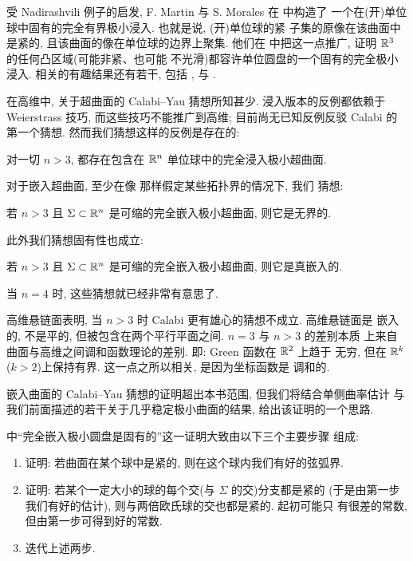 受 Nadirashvili 例子的启发, F. Martin 与 S. Morales 在 \cite{MaMo2} 中构造了
一个在(开)单位球中固有的完全有界极小浸入. 也就是说, (开)单位球的紧
子集的原像在该曲面中是紧的, 且该曲面的像在单位球的边界上聚集. 他们在
\cite{MaMo3} 中把这一点推广, 证明 $\mathbb{R}^3$ 的任何凸区域(可能非紧、也可能
不光滑)都容许单位圆盘的一个固有的完全极小浸入. 相关的有趣结果还有若干,
包括 \cite{AFM}, \cite{MaMeNa} 与 \cite{ANa}.

在高维中, 关于超曲面的 Calabi--Yau 猜想所知甚少. 浸入版本的反例都依赖于
Weierstrass 技巧, 而这些技巧不能推广到高维; 目前尚无已知反例反驳 Calabi
的第一个猜想. 然而我们猜想这样的反例是存在的:

\begin{conjecture}
\label{conj:8.20}
对一切 $n>3$, 都存在包含在 $\mathbb{R}^n$ 单位球中的完全浸入极小超曲面.
\end{conjecture}

对于嵌入超曲面, 至少在像 \cite{CM24} 那样假定某些拓扑界的情况下, 我们
猜想:

\begin{conjecture}
\label{conj:8.21}
若 $n>3$ 且 $\Sigma\subset\mathbb{R}^n$ 是可缩的完全嵌入极小超曲面, 则它是无界的.
\end{conjecture}

此外我们猜想固有性也成立:

\begin{conjecture}
\label{conj:8.22}
若 $n>3$ 且 $\Sigma\subset\mathbb{R}^n$ 是可缩的完全嵌入极小超曲面, 则它是真嵌入的.
\end{conjecture}

当 $n=4$ 时, 这些猜想就已经非常有意思了.

高维悬链面表明, 当 $n>3$ 时 Calabi 更有雄心的猜想不成立. 高维悬链面是
嵌入的, 不是平的, 但被包含在两个平行平面之间. $n=3$ 与 $n>3$ 的差别本质
上来自曲面与高维之间调和函数理论的差别. 即: Green 函数在 $\mathbb{R}^2$ 上趋于
无穷, 但在 $\mathbb{R}^k$($k>2$)上保持有界. 这一点之所以相关, 是因为坐标函数是
调和的.

嵌入曲面的 Calabi--Yau 猜想的证明超出本书范围, 但我们将结合单侧曲率估计
与我们前面描述的若干关于几乎稳定极小曲面的结果, 给出该证明的一个思路.

\cite{CM24} 中``完全嵌入极小圆盘是固有的''这一证明大致由以下三个主要步骤
组成:

\begin{enumerate}
\item 证明: 若曲面在某个球中是紧的, 则在这个球内我们有好的弦弧界.
\item 证明: 若某个一定大小的球的每个交(与 $\Sigma$ 的交)分支都是紧的
(于是由第一步我们有好的估计), 则与两倍欧氏球的交也都是紧的. 起初可能只
有很差的常数, 但由第一步可得到好的常数.
\item 迭代上述两步.
\end{enumerate}

